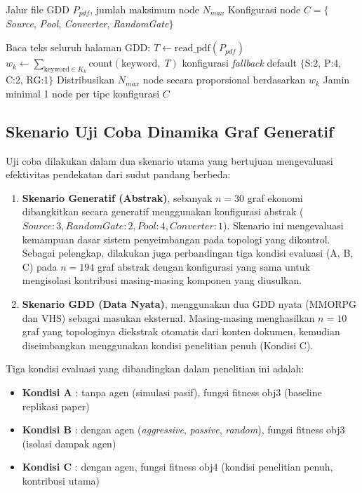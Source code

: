 \begin{algorithm}[h]
\caption{Ekstraksi Konfigurasi GEEvo dari GDD}
\label{alg:gdd-extractor}
\begin{algorithmic}[1]
\INPUT Jalur file GDD $P_{pdf}$, jumlah maksimum node $N_{max}$
\OUTPUT Konfigurasi node $C = \{$\textit{Source}, \textit{Pool}, \textit{Converter}, \textit{RandomGate}$\}$

\State Baca teks seluruh halaman GDD: $T \gets \text{read\_pdf}(P_{pdf})$
    \State $w_k \gets \sum_{\text{keyword} \in K_k} \text{count}(\text{keyword},\; T)$
\EndFor
{}
    \State \Return konfigurasi \textit{fallback} default $\{$S:2, P:4, C:2, RG:1$\}$
\EndIf
\State Distribusikan $N_{max}$ node secara proporsional berdasarkan $w_k$
\State Jamin minimal 1 node per tipe
\State \Return konfigurasi $C$
\end{algorithmic}
\end{algorithm}

\subsection{Skenario Uji Coba Dinamika Graf Generatif}

Uji coba dilakukan dalam dua skenario utama yang bertujuan mengevaluasi efektivitas pendekatan dari sudut pandang berbeda:

\begin{enumerate}
    \item \textbf{Skenario Generatif (Abstrak)}, sebanyak $n = 30$ graf ekonomi dibangkitkan secara generatif menggunakan konfigurasi abstrak ($\textit{Source}: 3, \textit{RandomGate}: 2, \textit{Pool}: 4, \textit{Converter}: 1$). Skenario ini mengevaluasi kemampuan dasar sistem penyeimbangan pada topologi yang dikontrol. Sebagai pelengkap, dilakukan juga perbandingan tiga kondisi evaluasi (A, B, C) pada $n = 194$ graf abstrak dengan konfigurasi yang sama untuk mengisolasi kontribusi masing-masing komponen yang diusulkan.

    \item \textbf{Skenario GDD (Data Nyata)}, menggunakan dua GDD nyata (MMORPG dan VHS) sebagai masukan eksternal. Masing-masing menghasilkan $n = 10$ graf yang topologinya diekstrak otomatis dari konten dokumen, kemudian diseimbangkan menggunakan kondisi penelitian penuh (Kondisi C).
\end{enumerate}

Tiga kondisi evaluasi yang dibandingkan dalam penelitian ini adalah:
\begin{itemize}
    \item \textbf{Kondisi A} : tanpa agen (simulasi pasif), fungsi fitness obj3 (baseline replikasi paper)
    \item \textbf{Kondisi B} : dengan agen (\textit{aggressive}, \textit{passive}, \textit{random}), fungsi fitness obj3 (isolasi dampak agen)
    \item \textbf{Kondisi C} : dengan agen, fungsi fitness obj4 (kondisi penelitian penuh, kontribusi utama)
\end{itemize}

